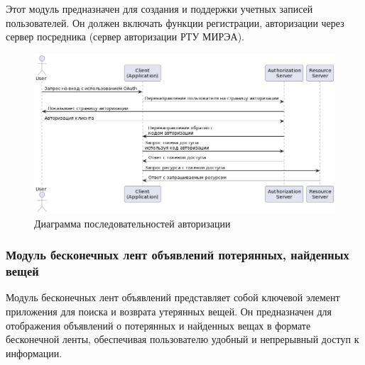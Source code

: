 Этот модуль предназначен для создания и поддержки учетных записей пользователей. Он должен включать функции регистрации, авторизации через сервер посредника (сервер авторизации РТУ МИРЭА).


\begin{figure}[htb]
	\centering
	\includegraphics[width=.9\textwidth]{images/registation-diagram.png}
	\parskip=6pt
	\caption{Диаграмма последовательностей авторизации}
	\label{fig:authDiagram}
\end{figure}

\subsubsection{Модуль бесконечных лент объявлений потерянных, найденных вещей}

Модуль бесконечных лент объявлений представляет собой ключевой элемент приложения для поиска и возврата утерянных вещей. Он предназначен для отображения объявлений о потерянных и найденных вещах в формате бесконечной ленты, обеспечивая пользователю удобный и непрерывный доступ к информации.

